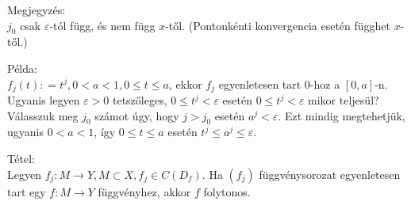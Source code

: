 \documentclass[12pt,a4paper]{scrartcl}
\newenvironment{tetel}{}{}
\newenvironment{megjegyzes}{}{}
\newenvironment{pelda}{}{}
\begin{document}
\begin{megjegyzes}

Megjegyzés:\\
\(j_{0}\) csak \(\varepsilon\)-tól függ, és nem függ \(x\)-től.
(Pontonkénti konvergencia esetén függhet \(x\)-től.)

\end{megjegyzes}

\begin{pelda}

Példa:\\
\(f_{j}\left( t \right): = t^{j},0 < a < 1,0 \leq t \leq a\), ekkor
\(f_{j}\) egyenletesen tart 0-hoz a
\(\left\lbrack {0,a} \right\rbrack\)-n. Ugyanis legyen
\(\varepsilon > 0\) tetszőleges, \(0 \leq t^{j} < \varepsilon\) esetén
\(0 \leq t^{j} < \varepsilon\) mikor teljesül? Válasszuk meg \(j_{0}\)
számot úgy, hogy \(j > j_{0}\) esetén \(a^{j} < \varepsilon\). Ezt
mindig megtehetjük, ugyanis \(0 < a < 1\), így \(0 \leq t \leq a\)
esetén \(t^{j} \leq a^{j} \leq \varepsilon\).

\end{pelda}

\begin{tetel}

Tétel:\\
Legyen
\(\left. f_{j}:M\rightarrow Y,M \subset X,f_{j} \in C\left( D_{f} \right) \right.\).
Ha \(\left( f_{j} \right)\) függvénysorozat egyenletesen tart egy
\(\left. f:M\rightarrow Y \right.\) függvényhez, akkor \(f\) folytonos.

\end{tetel}
\end{document}
